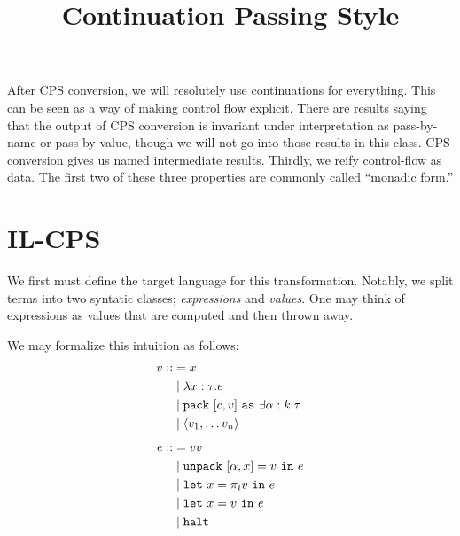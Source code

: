 \documentclass{amsart}
\title{Continuation Passing Style}
\newcommand{\pack}{\text{\texttt{pack} }}
\newcommand{\unpack}{\text{\texttt{unpack} }}
\newcommand{\iin}{\text{ \texttt{in} }}
\newcommand{\halt}{\text{\texttt{halt}}}
\newcommand{\llet}{\text{\texttt{let} }}
\newcommand{\as}{\text{ \texttt{as} }}
\begin{document}
\maketitle

After CPS conversion, we will resolutely use continuations for everything. This can be seen as a way of making control flow explicit. There are results saying that the output of CPS conversion is invariant under interpretation as pass-by-name or pass-by-value, though we will not go into those results in this class. CPS conversion gives us named intermediate results. Thirdly, we reify control-flow as data. The first two of these three properties are commonly called ``monadic form.''

\section{IL-CPS}

We first must define the target language for this transformation. Notably, we split terms into two syntatic classes; \emph{expressions} and \emph{values}. One may think of expressions as values that are computed and then thrown away. 

We may formalize this intuition as follows:
\begin{align*}
v ::&= x\\
&\mid \lambda x : \tau . e\\
&\mid \pack [c,v] \as \exists \alpha : k .\tau\\
&\mid \langle v_1, \ldots v_n \rangle\\[1ex]
e ::&= v v \\
&\mid \unpack [\alpha, x] = v \iin e\\
&\mid \llet x = \pi_i v \iin e\\
&\mid \llet x = v \iin e\\
&\mid \halt
\end{align*}
\end{document}
